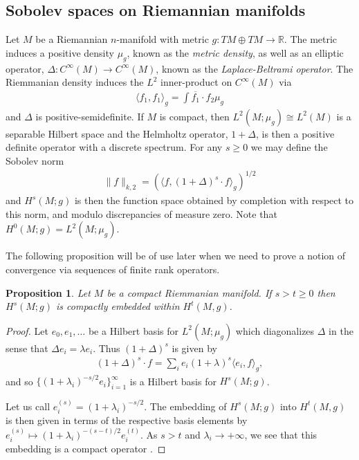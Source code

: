 \documentclass[12pt]{amsart}
\newtheorem{prop}[thm]{Proposition}
\begin{document}
\subsection{Sobolev spaces on Riemannian manifolds}
\label{sec:Sobolev spaces}
Let $M$ be a Riemannian $n$-manifold with metric $g:TM \oplus TM \to \mathbb{R}$.
The metric induces a positive density $\mu_g$,
known as the \emph{metric density},
as well as an elliptic operator,
$\Delta:C^\infty(M) \to C^{\infty}(M)$,
known as the \emph{Laplace-Beltrami operator}. 
The Riemmanian density induces the $L^2$ inner-product on $C^\infty(M)$ via
\begin{align*}
	\langle f_1 , f_1 \rangle_{g} = \int \overline{f_1} \cdot f_2 \mu_g
\end{align*}
and $\Delta$ is positive-semidefinite.
If $M$ is compact, then $L^2(M ; \mu_g) \cong L^2(M)$ is a separable Hilbert space
and the Helmholtz operator, $1 + \Delta$, is then a positive definite operator
with a discrete spectrum.
For any $s \geq 0$ we may define the Sobolev norm
\begin{align*}
	\| f \|_{k,2} =  \left( \langle f , (1+\Delta)^s \cdot f \rangle_{g} \right)^{1/2}
\end{align*}
and $H^s(M ; g)$ is then the function space obtained by completion with respect to this norm, and modulo discrepancies of measure zero.
Note that $H^0(M;g) = L^2(M;\mu_g)$.

The following proposition will be of use later when we need to prove a notion of convergence
via sequences of finite rank operators.

\begin{prop} \label{prop:compact_embedding}
	Let $M$ be a compact Riemmanian manifold.  If $s > t \geq 0$ then $H^s(M;g)$ is compactly embedded within $H^t(M,g)$.
\end{prop}
\begin{proof}
	Let $e_0, e_1,\dots$ be a Hilbert basis for $L^2(M;\mu_g)$ which diagonalizes $\Delta$
	in the sense that $\Delta e_i = \lambda e_i$.
	Thus $(1+\Delta)^s$ is given by
	\begin{align*}
		(1+\Delta)^s \cdot f =  \sum_{i} e_i (1+\lambda)^s \langle e_i , f \rangle_g,
	\end{align*}
	and so $\{ (1+ \lambda_i)^{-s/2} e_i \}_{i=1}^{\infty}$ is a Hilbert basis for $H^s(M;g)$.
	
	Let us call $e_i^{(s)} = (1+ \lambda_i)^{-s/2}$.
	The embedding of $H^s(M;g)$ into $H^t(M,g)$
	is then given in terms of the respective basis elements by $e_i^{(s)} \mapsto (1+\lambda_i)^{-(s-t)/2}e_i^{(t)}$.
	As $s > t$ and $\lambda_i \to +\infty$, we see that 
	this embedding is a compact operator \cite[see Proposition 4.6]{Conway1990}.
\end{proof}
\end{document}
